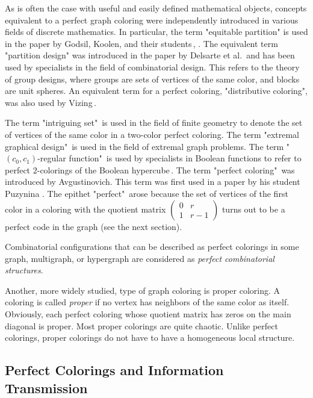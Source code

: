 \documentclass[11pt]{article}
\theoremstyle{definition}
\begin{document}
As is often the case with useful and easily defined mathematical objects, concepts equivalent to a perfect graph coloring were independently introduced in various fields of discrete mathematics. In particular, the term "equitable partition" is used in the paper by Godsil, Koolen, and their students\,\cite{Godsil0}, \cite{Martin}. The equivalent term "partition design" was introduced in the paper by Delsarte et al.\,\cite{CCD} and has been used by specialists in the field of combinatorial design. This refers to the theory of group designs, where groups are sets of vertices of the same color, and blocks are unit spheres. 
 An equivalent term for a  perfect coloring,
"distributive coloring", was also used by  Vizing\,\cite{Vizing}. 

The term "intriguing set"\,\cite{Kelly} is used in the field of
finite geometry   to denote the set of vertices of the same color in a two-color perfect coloring.  The term "extremal graphical
design"\,\cite{Golubev} is used in the field of extremal graph problems.
The term "$(c_0,c_1)$-regular function"\  is used by specialists in Boolean functions to refer to
perfect $2$-colorings of the Boolean hypercube\,\cite{Taran02}. The term "perfect
coloring"\ was introduced by  Avgustinovich. This term
was first used  in a paper by his student Puzynina \cite{Puz}. The epithet "perfect"\ arose because the set of vertices
of the first color in a coloring with the quotient matrix $\begin{pmatrix}
0 & r \\
1 & r-1
\end{pmatrix}$
turns out to be a perfect code in the graph (see the next section).

Combinatorial configurations that can be described as
perfect colorings in some graph, multigraph, or
hypergraph are considered as {\sl perfect  combinatorial structures}.


Another, more widely studied, type of graph coloring is proper
coloring.
A coloring is called {\sl proper} if no vertex has neighbors
of the same color as itself.
Obviously, each perfect coloring whose quotient matrix
has zeros on the main diagonal is proper. Most proper
colorings are quite chaotic. Unlike perfect colorings, proper colorings do not have to have a homogeneous local structure.

\subsection{Perfect Colorings and Information Transmission}\label{sec:it}
\end{document}
